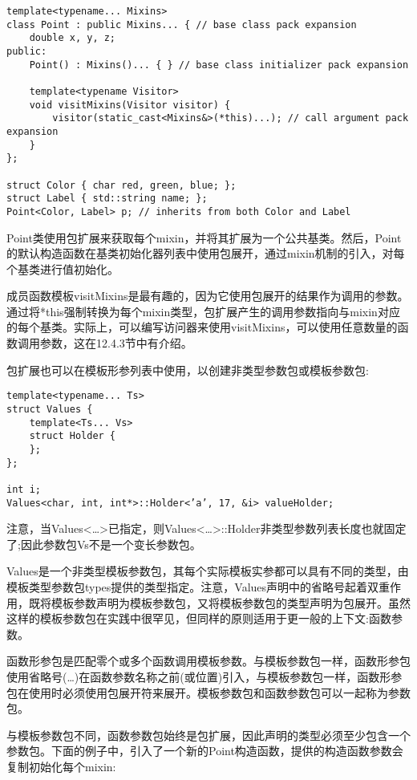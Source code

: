 \begin{lstlisting}[style=styleCXX]
template<typename... Mixins>
class Point : public Mixins... { // base class pack expansion
	double x, y, z;
public:
	Point() : Mixins()... { } // base class initializer pack expansion
	
	template<typename Visitor>
	void visitMixins(Visitor visitor) {
		visitor(static_cast<Mixins&>(*this)...); // call argument pack expansion
	}
};

struct Color { char red, green, blue; };
struct Label { std::string name; };
Point<Color, Label> p; // inherits from both Color and Label
\end{lstlisting}

Point类使用包扩展来获取每个mixin，并将其扩展为一个公共基类。然后，Point的默认构造函数在基类初始化器列表中使用包展开，通过mixin机制的引入，对每个基类进行值初始化。

成员函数模板visitMixins是最有趣的，因为它使用包展开的结果作为调用的参数。通过将*this强制转换为每个mixin类型，包扩展产生的调用参数指向与mixin对应的每个基类。实际上，可以编写访问器来使用visitMixins，可以使用任意数量的函数调用参数，这在12.4.3节中有介绍。

包扩展也可以在模板形参列表中使用，以创建非类型参数包或模板参数包:

\begin{lstlisting}[style=styleCXX]
template<typename... Ts>
struct Values {
	template<Ts... Vs>
	struct Holder {
	};
};

int i;
Values<char, int, int*>::Holder<’a’, 17, &i> valueHolder;
\end{lstlisting}

注意，当Values<…>已指定，则Values<…>::Holder非类型参数列表长度也就固定了;因此参数包Vs不是一个变长参数包。

Values是一个非类型模板参数包，其每个实际模板实参都可以具有不同的类型，由模板类型参数包types提供的类型指定。注意，Values声明中的省略号起着双重作用，既将模板参数声明为模板参数包，又将模板参数包的类型声明为包展开。虽然这样的模板参数包在实践中很罕见，但同样的原则适用于更一般的上下文:函数参数。


函数形参包是匹配零个或多个函数调用模板参数。与模板参数包一样，函数形参包使用省略号(…)在函数参数名称之前(或位置)引入，与模板参数包一样，函数形参包在使用时必须使用包展开符来展开。模板参数包和函数参数包可以一起称为参数包。

与模板参数包不同，函数参数包始终是包扩展，因此声明的类型必须至少包含一个参数包。下面的例子中，引入了一个新的Point构造函数，提供的构造函数参数会复制初始化每个mixin:

